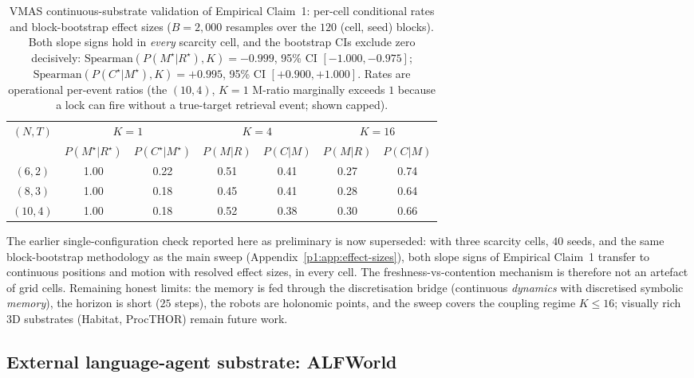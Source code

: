 \documentclass{article}
\begin{document}
\begin{table}[h]
\caption{VMAS continuous-substrate validation of Empirical Claim~1: per-cell conditional rates and block-bootstrap effect sizes ($B{=}2{,}000$ resamples over the $120$ (cell, seed) blocks). Both slope signs hold in \emph{every} scarcity cell, and the bootstrap CIs exclude zero decisively: $\mathrm{Spearman}(P(M^\star|R^\star),K) = -0.999$, 95\% CI $[-1.000,-0.975]$; $\mathrm{Spearman}(P(C^\star|M^\star),K) = +0.995$, 95\% CI $[+0.900,+1.000]$. Rates are operational per-event ratios (the $(10,4)$, $K{=}1$ M-ratio marginally exceeds $1$ because a lock can fire without a true-target retrieval event; shown capped).}
\label{p1:tab:vmas}
\centering
\small
\begin{tabular}{c c c c c c c}
\toprule
$(N,T)$ & \multicolumn{2}{c}{$K{=}1$} & \multicolumn{2}{c}{$K{=}4$} & \multicolumn{2}{c}{$K{=}16$} \\
 & $P(M^\star|R^\star)$ & $P(C^\star|M^\star)$ & $P(M|R)$ & $P(C|M)$ & $P(M|R)$ & $P(C|M)$ \\
\midrule
$(6,2)$  & 1.00 & 0.22 & 0.51 & 0.41 & 0.27 & 0.74 \\
$(8,3)$  & 1.00 & 0.18 & 0.45 & 0.41 & 0.28 & 0.64 \\
$(10,4)$ & 1.00 & 0.18 & 0.52 & 0.38 & 0.30 & 0.66 \\
\bottomrule
\end{tabular}
\end{table}

The earlier single-configuration check reported here as preliminary is now
superseded: with three scarcity cells, $40$ seeds, and the same block-bootstrap
methodology as the main sweep (Appendix~\ref{p1:app:effect-sizes}), both slope
signs of Empirical Claim~1 transfer to continuous positions and motion with
resolved effect sizes, in every cell. The freshness-vs-contention mechanism is
therefore not an artefact of grid cells. Remaining honest limits: the memory is
fed through the discretisation bridge (continuous \emph{dynamics} with
discretised symbolic \emph{memory}), the horizon is short ($25$ steps), the
robots are holonomic points, and the sweep covers the coupling regime
$K\le16$; visually rich 3D substrates (Habitat, ProcTHOR) remain future work.

\subsection{External language-agent substrate: ALFWorld}
\label{p1:app:alfworld}
\end{document}
